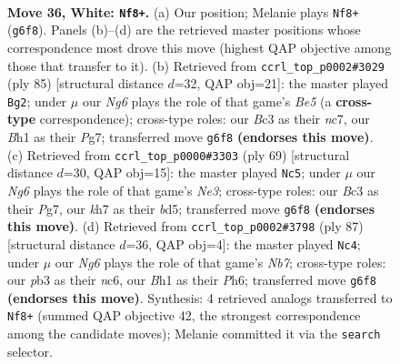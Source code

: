 \documentclass[11pt]{article}
\begin{document}
\clearpage

\begin{figure}[p]\centering
\begin{subfigure}{0.46\textwidth}\centering
\resizebox{\linewidth}{!}{%
\newchessgame
\chessboard[
  setfen={8/7k/6N1/3p1p2/2p2P2/1pB2n2/1P2b3/1K5B w - - 8 36},
  showmover=false,
  pgfstyle=straightmove, color=movearrow, markmove={g6-f8}
]}
\caption{}
\end{subfigure}\hfill
\begin{subfigure}{0.46\textwidth}\centering
\resizebox{\linewidth}{!}{%
\newchessgame
\chessboard[
  setfen={5k2/2N2pp1/2n4p/8/1p2bP2/1P2K1P1/7P/3B4 b - - 6 43},
  showmover=false,
  pgfstyle=straightmove, color=movearrow, markmove={e4-g2}
]}
\caption{}
\end{subfigure}
\\[4pt]
\begin{subfigure}{0.46\textwidth}\centering
\resizebox{\linewidth}{!}{%
\newchessgame
\chessboard[
  setfen={8/2b1k1p1/4n3/1P1Bpp1p/2N4P/5P2/6P1/6K1 b - - 0 35},
  showmover=false,
  pgfstyle=straightmove, color=movearrow, markmove={e6-c5}
]}
\caption{}
\end{subfigure}\hfill
\begin{subfigure}{0.46\textwidth}\centering
\resizebox{\linewidth}{!}{%
\newchessgame
\chessboard[
  setfen={8/8/2Np1k1p/2bP4/5p2/7P/1nB1KPP1/8 b - - 13 44},
  showmover=false,
  pgfstyle=straightmove, color=movearrow, markmove={b2-c4}
]}
\caption{}
\end{subfigure}
\caption{\textbf{Move 36, White: \texttt{Nf8+}.} (a) Our position; Melanie plays \texttt{Nf8+} (\texttt{g6f8}). Panels (b)--(d) are the retrieved master positions whose correspondence most drove this move (highest QAP objective among those that transfer to it). (b) Retrieved from \texttt{ccrl\_top\_p0002\#3029} (ply 85) [structural distance $d$=32, QAP obj=21]: the master played \texttt{Bg2}; under $\mu$ our \emph{Ng6} plays the role of that game's \emph{Be5} (a \textbf{cross-type} correspondence); cross-type roles: our \emph{B}c3 as their \emph{n}c7, our \emph{B}h1 as their \emph{P}g7; transferred move \texttt{g6f8} \textbf{(endorses this move)}. (c) Retrieved from \texttt{ccrl\_top\_p0000\#3303} (ply 69) [structural distance $d$=30, QAP obj=15]: the master played \texttt{Nc5}; under $\mu$ our \emph{Ng6} plays the role of that game's \emph{Ne3}; cross-type roles: our \emph{B}c3 as their \emph{P}g7, our \emph{k}h7 as their \emph{b}d5; transferred move \texttt{g6f8} \textbf{(endorses this move)}. (d) Retrieved from \texttt{ccrl\_top\_p0002\#3798} (ply 87) [structural distance $d$=36, QAP obj=4]: the master played \texttt{Nc4}; under $\mu$ our \emph{Ng6} plays the role of that game's \emph{Nb7}; cross-type roles: our \emph{p}b3 as their \emph{n}c6, our \emph{B}h1 as their \emph{P}h6; transferred move \texttt{g6f8} \textbf{(endorses this move)}. Synthesis: 4 retrieved analogs transferred to \texttt{Nf8+} (summed QAP objective 42, the strongest correspondence among the candidate moves); Melanie committed it via the \texttt{search} selector.}
\label{fig:thought-m70}
\end{figure}
\end{document}
